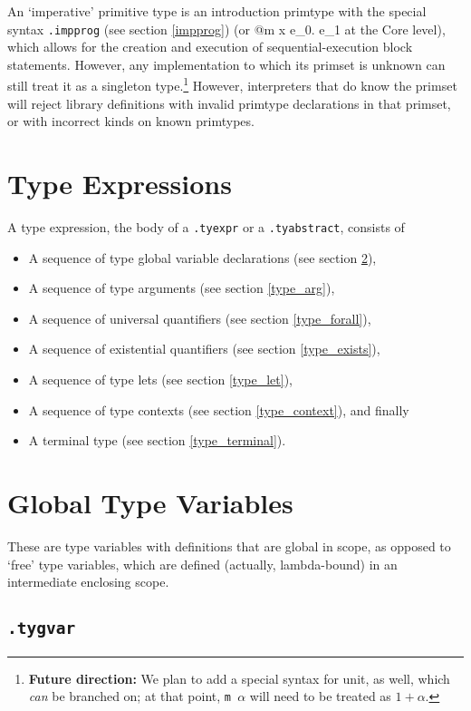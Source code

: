 \documentclass{report}
\newcommand\stringcode[1]{\texttt{#1}}
\newcommand\future[1]{\footnote{\textbf{Future direction:} #1}}
\begin{document}
An `imperative' primitive type is an introduction primtype with the special syntax \stringcode{.impprog} (see section \ref{impprog})
(or \< @m x \gets e_0. e_1\> at the Core level),
which allows for the creation and execution of sequential-execution block statements.
However, any implementation to which its primset is unknown can still treat it as a singleton type.\future{We plan to add a special syntax for unit, as well, which \emph{can} be branched on;
at that point, \stringcode{m $\alpha$} will need to be treated as $1 + \alpha$.}
However, interpreters that do know the primset will reject library definitions with invalid primtype declarations in that primset,
or with incorrect kinds on known primtypes.

\section{Type Expressions}
\label{type_ops}

A type expression, the body of a \stringcode{.tyexpr} or a \stringcode{.tyabstract}, consists of
\begin{itemize}
    \item A sequence of type global variable declarations (see section \ref{type_gvar}),
    \item A sequence of type arguments (see section \ref{type_arg}),
    \item A sequence of universal quantifiers (see section \ref{type_forall}),
    \item A sequence of existential quantifiers (see section \ref{type_exists}),
    \item A sequence of type lets (see section \ref{type_let}),
    \item A sequence of type contexts (see section \ref{type_context}), and finally
    \item A terminal type (see section \ref{type_terminal}).
\end{itemize}

\section{Global Type Variables}
\label{type_gvar}

These are type variables with definitions that are global in scope,
as opposed to `free' type variables, which are defined (actually, lambda-bound) in an intermediate enclosing scope.

\subsection{\stringcode{.tygvar}}
\end{document}
